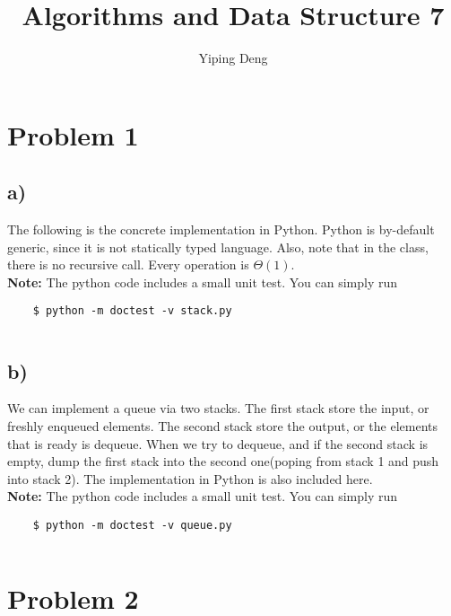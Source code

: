 \documentclass{article}
\newcommand{\hwnumber}{7}
\begin{document}
\title{Algorithms and Data Structure \hwnumber}
\author{Yiping Deng}
\maketitle
\thispagestyle{fancy}
\section*{Problem 1}
\subsection*{a)}
The following is the concrete implementation in Python. Python is by-default generic, since it is not statically typed language.
Also, note that in the class, there is no recursive call.
Every operation is $\Theta(1)$.\\
\textbf{Note:} The python code includes a small unit test. You can simply run
\begin{verbatim}
    $ python -m doctest -v stack.py
\end{verbatim}
\begin{framed}
\inputminted{python}{stack.py}
\end{framed}
\subsection*{b)}
We can implement a queue via two stacks. The first stack store the input, or freshly enqueued elements. The second stack store the output, or the elements
that is ready is dequeue.
When we try to dequeue, and if the second stack is empty, dump the first stack into the second one(poping from stack 1 and push into stack 2).
The implementation in Python is also included here.\\
\textbf{Note:} The python code includes a small unit test. You can simply run
\begin{verbatim}
    $ python -m doctest -v queue.py
\end{verbatim}
\begin{framed}
\inputminted{python}{queue.py}
\end{framed}
\section*{Problem 2}
\end{document}
